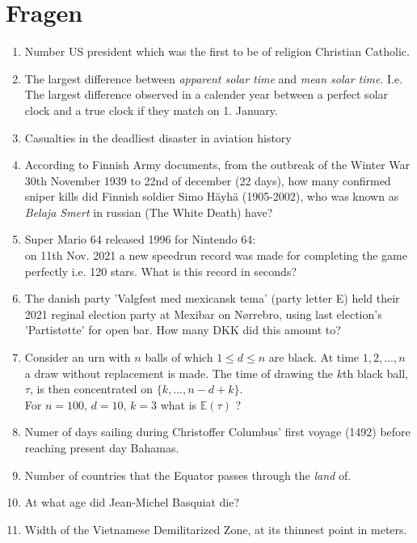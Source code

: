 \documentclass[12pt,a4paper]{article}
\begin{document}
\section*{Fragen}
\begin{enumerate}


\item Number US president which was the first to be of religion Christian Catholic.

\item The largest difference between \textit{apparent solar time} and \textit{mean solar time}. 
I.e. The largest difference observed in a calender year between a perfect solar clock and a true clock if they match on 1. January.

\item Casualties in the deadliest disaster in aviation history

\item According to Finnish Army documents, from the outbreak of the Winter War 30th November 1939 to 22nd of december (22 days), how many confirmed sniper kills did Finnish soldier Simo Häyhä (1905-2002), who was known as \textit{Belaja Smert} in russian (The White Death) have?

\item Super Mario 64 released 1996 for Nintendo 64: \\
on 11th Nov. 2021 a new speedrun record was made for completing the game perfectly i.e. 120 stars. What is this record in seconds? 

\item The danish party 'Valgfest med mexicansk tema' (party letter E) held their 2021 reginal election party at Mexibar on Nørrebro, using last election's 'Partistøtte' for open bar. How many DKK did this amount to?

  
  \item Consider an urn with $n$ balls of which $1 \leq d \leq n$ are black. At time $1,2,...,n$ a draw without replacement is made. The time of drawing the $k$th black ball, $\tau$, is then concentrated on $\{k,...,n-d+k\}$.\\
  For $n = 100,\, d = 10,\, k = 3$ what is $ \mathbb{E}(\tau) $ ?
  
\item Numer of days sailing during Christoffer Columbus' first voyage (1492) before reaching present day Bahamas.

\item Number of countries that the Equator passes through the \textit{land} of. 

\item At what age did Jean-Michel Basquiat die?

\item Width of the Vietnamese Demilitarized Zone, at its thinnest point in meters.


  
  
 

\end{enumerate}
\end{document}
